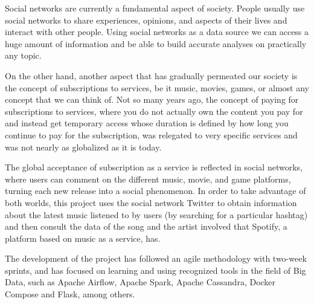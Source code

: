 

\nonzeroparskip Social networks are currently a fundamental aspect of society. People usually use social networks to share experiences, opinions, and aspects of their lives and interact with other people. Using social networks as a data source we can access a huge amount of information and be able to build accurate analyses on practically any topic.

\nonzeroparskip On the other hand, another aspect that has gradually permeated our society is the concept of subscriptions to services, be it music, movies, games, or almost any concept that we can think of. Not so many years ago, the concept of paying for subscriptions to services, where you do not actually own the content you pay for and instead get temporary access whose duration is defined by how long you continue to pay for the subscription, was relegated to very specific services and was not nearly as globalized as it is today.

\nonzeroparskip The global acceptance of subscription as a service is reflected in social networks, where users can comment on the different music, movie, and game platforms, turning each new release into a social phenomenon. In order to take advantage of both worlds, this project uses the social network Twitter to obtain information about the latest music listened to by users (by searching for a particular hashtag) and then consult the data of the song and the artist involved that Spotify, a platform based on music as a service, has.

\nonzeroparskip The development of the project has followed an agile methodology with two-week sprints, and has focused on learning and using recognized tools in the field of Big Data, such as Apache Airflow, Apache Spark, Apache Cassandra, Docker Compose and Flask, among others.